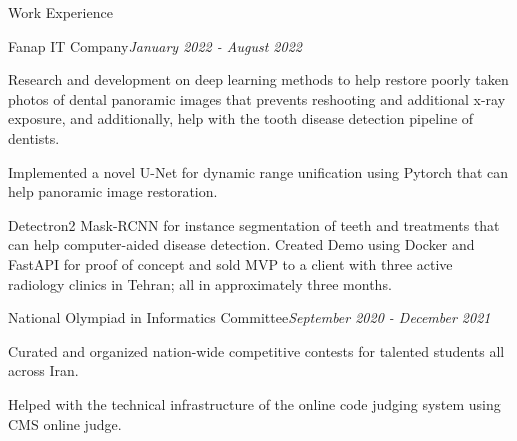 \documentclass{resume} %
\begin{document}


\begin{rSection}{Work Experience}
\begin{small}
\begin{rSubsection}{Fanap IT Company}{\textcolor{Black!70}{\it January 2022 - August 2022}}{}{}
\itemsep -2pt
\item Research and development on deep learning methods to help restore poorly taken photos of dental panoramic images that prevents reshooting and additional x-ray exposure, and additionally, help with the tooth disease detection pipeline of dentists. 
\item Implemented a novel U-Net for dynamic range unification using Pytorch that can help panoramic image restoration.
\item Detectron2 Mask-RCNN for instance segmentation of teeth and treatments that can help computer-aided disease detection.
Created Demo using Docker and FastAPI for proof of concept and sold MVP to a client with three active radiology clinics in Tehran; all in approximately three months.

\end{rSubsection}
\begin{rSubsection}{National Olympiad in Informatics Committee}{\textcolor{Black!70}{\it September 2020 - December 2021}}{}{}
\itemsep -2pt
\item Curated and organized nation-wide competitive contests for talented students all across Iran.
\item Helped with the technical infrastructure of the online code judging system using CMS online judge.
\end{rSubsection}
\end{small}
\end{rSection}
\end{document}
